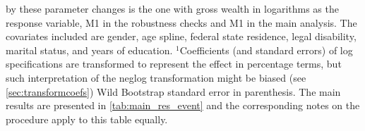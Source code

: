 \begin{table}[htbp!]
\begin{adjustbox}{max width=1\textwidth}
\begin{threeparttable}
\begin{tablenotes}
                by these parameter changes is the one with gross wealth in logarithms as the response variable, M1 in the
                robustness checks and M1 in the main analysis. 
                The covariates included are gender, age spline, federal state residence, legal disability, marital status, and years of education.
                $^1$Coefficients (and standard errors) of log specifications are transformed to represent the effect in percentage terms, but
                such interpretation of the neglog transformation might be biased (see \cref{sec:transformcoefs})
                Wild Bootstrap standard error in parenthesis. 
                The main results are presented in \cref{tab:main_res_event} and the corresponding notes 
                on the procedure apply to this table equally. 
            \end{tablenotes}
        \end{threeparttable}
    \end{adjustbox}
\end{table}





